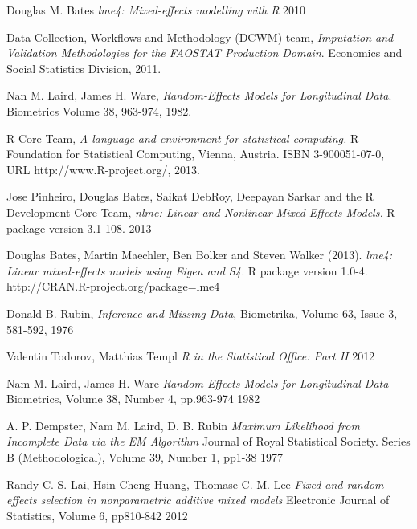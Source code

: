 \documentclass[nojss]{jss}\usepackage[]{graphicx}\usepackage[]{color}
\begin{document}
\begin{thebibliography}{9}
  Douglas M. Bates
  \emph{lme4: Mixed-effects modelling with R}
  2010
  
  Data Collection, Workflows and Methodology (DCWM) team,
  \emph{Imputation and Validation Methodologies for the FAOSTAT Production Domain}.
  Economics and Social Statistics Division,
  2011.
  
  Nan M. Laird, James H. Ware,
  \emph{Random-Effects Models for Longitudinal Data}.
  Biometrics Volume 38, 963-974,
  1982.
  
  R Core Team,
  \emph{A language and environment for statistical computing.}
  R Foundation for Statistical Computing, Vienna, Austria.
  ISBN 3-900051-07-0, URL http://www.R-project.org/,
  2013.
  
  Jose Pinheiro, Douglas Bates, Saikat DebRoy, Deepayan Sarkar and the
  R Development Core Team,
  \emph{nlme: Linear and Nonlinear Mixed Effects Models.} 
  R package version 3.1-108.
  2013

  Douglas Bates, Martin Maechler, Ben Bolker and Steven Walker (2013).
  \emph{lme4: Linear mixed-effects models using Eigen and S4.} 
  R package version 1.0-4. http://CRAN.R-project.org/package=lme4
 
  Donald B. Rubin,
  \emph{Inference and Missing Data},
  Biometrika, Volume 63, Issue 3, 581-592,
  1976
  
  Valentin Todorov, Matthias Templ
  \emph{R in the Statistical Office: Part II}
  2012
  
  Nam M. Laird, James H. Ware
  \emph{Random-Effects Models for Longitudinal Data}
  Biometrics, Volume 38, Number 4, pp.963-974
  1982

  A. P. Dempster, Nam M. Laird, D. B. Rubin
  \emph{Maximum Likelihood from Incomplete Data via the EM Algorithm}
  Journal of Royal Statistical Society. Series B (Methodological), Volume 39, Number 1, pp1-38
  1977
  
  Randy C. S. Lai, Hsin-Cheng Huang, Thomase C. M. Lee
  \emph{Fixed and random effects selection in nonparametric additive mixed models}
  Electronic Journal of Statistics, Volume 6, pp810-842
  2012
\end{thebibliography}
  
\end{document}
